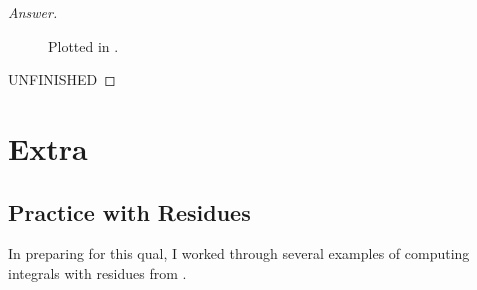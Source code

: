 \documentclass[12pt]{article}
\theoremstyle{definition}
\begin{document}
\begin{proof}[Answer]
\begin{figure}[H]
\begin{subfigure}{0.45\textwidth}
            \label{fig:12b}
        \end{subfigure}
        \caption{Plotted in \cite{Desmos}.}
    \end{figure}
    UNFINISHED
\end{proof}

\newpage 
\section{Extra}
\subsection{Practice with Residues \texorpdfstring{\cite{Conway,Ryan}}{}}
In preparing for this qual, I worked through several examples of computing integrals with residues from \cite{Conway}. 
\end{document}
